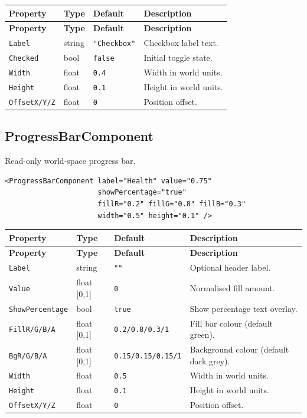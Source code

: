\documentclass[11pt,a4paper]{article}
\begin{document}
\begin{longtable}{P{3.2cm} P{2cm} P{2.5cm} P{5.3cm}}
  \toprule
  \textbf{Property} & \textbf{Type} & \textbf{Default} & \textbf{Description} \\
  \midrule
  \endfirsthead
  \toprule
  \textbf{Property} & \textbf{Type} & \textbf{Default} & \textbf{Description} \\
  \midrule
  \endhead
  \texttt{Label} & string & \texttt{"Checkbox"} & Checkbox label text. \\
  \texttt{Checked} & bool & \texttt{false} & Initial toggle state. \\
  \texttt{Width} & float & \texttt{0.4} & Width in world units. \\
  \texttt{Height} & float & \texttt{0.1} & Height in world units. \\
  \texttt{OffsetX/Y/Z} & float & \texttt{0} & Position offset. \\
  \bottomrule
\end{longtable}

\subsection{ProgressBarComponent}

Read-only world-space progress bar.

\begin{lstlisting}
<ProgressBarComponent label="Health" value="0.75"
                      showPercentage="true"
                      fillR="0.2" fillG="0.8" fillB="0.3"
                      width="0.5" height="0.1" />
\end{lstlisting}

\begin{longtable}{P{3.5cm} P{2cm} P{2.2cm} P{5.3cm}}
  \toprule
  \textbf{Property} & \textbf{Type} & \textbf{Default} & \textbf{Description} \\
  \midrule
  \endfirsthead
  \toprule
  \textbf{Property} & \textbf{Type} & \textbf{Default} & \textbf{Description} \\
  \midrule
  \endhead
  \texttt{Label} & string & \texttt{""} & Optional header label. \\
  \texttt{Value} & float [0,1] & \texttt{0} & Normalised fill amount. \\
  \texttt{ShowPercentage} & bool & \texttt{true} & Show percentage text overlay. \\
  \texttt{FillR/G/B/A} & float [0,1] &
    \texttt{0.2/0.8/0.3/1} & Fill bar colour (default green). \\
  \texttt{BgR/G/B/A} & float [0,1] &
    \texttt{0.15/0.15/0.15/1} & Background colour (default dark grey). \\
  \texttt{Width} & float & \texttt{0.5} & Width in world units. \\
  \texttt{Height} & float & \texttt{0.1} & Height in world units. \\
  \texttt{OffsetX/Y/Z} & float & \texttt{0} & Position offset. \\
  \bottomrule
\end{longtable}
\end{document}
